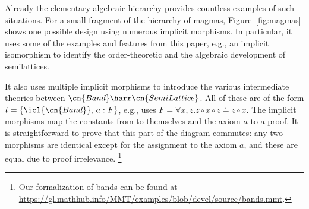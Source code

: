Already the elementary algebraic hierarchy provides countless examples of such situations.
For a small fragment of the hierarchy of magmas, Figure~\ref{fig:magmas} shows one possible design using numerous implicit morphisms.
In particular, it uses some of the examples and features from this paper, e.g., an implicit isomorphism to identify the order-theoretic and the algebraic development of semilattices.

It also uses multiple implicit morphisms to introduce the various intermediate theories between $\cn{Band}\harr\cn{SemiLattice}$. 
All of these are of the form $t=\{\icl{\cn{Band}},\,a: F\}$, e.g.,  uses $F=\forall x,z. z\circ x\circ z \doteq z\circ x$.
The implicit morphisms map the constants from  to themselves and the axiom $a$ to a proof.
It is straightforward to prove that this part of the diagram commutes: any two morphisms are identical except for the assignment to the axiom $a$, and these are equal due to proof irrelevance.%
\footnote{Our formalization of bands can be found at \url{https://gl.mathhub.info/MMT/examples/blob/devel/source/bands.mmt}.}


%  
%  
%  
%
% 

